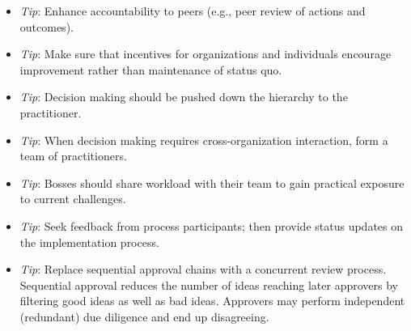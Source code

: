\begin{itemize}
\item \textit{Tip}: Enhance accountability to peers (e.g., peer review of actions and outcomes).
\item \textit{Tip}: Make sure that incentives for organizations and individuals encourage improvement rather than maintenance of status quo.
\item \textit{Tip}: Decision making should be pushed down the hierarchy to the practitioner.
\item \textit{Tip}: When decision making requires cross-organization interaction, form a team of practitioners.
\item \textit{Tip}: Bosses should share workload with their team to gain practical exposure to current challenges.
\item \textit{Tip}: Seek feedback from process participants; then provide status updates on the implementation process.

\item \textit{Tip}: Replace sequential approval chains with a concurrent review process. Sequential approval reduces the number of ideas reaching later approvers by filtering good ideas as well as bad ideas. Approvers may perform independent (redundant) due diligence and end up disagreeing. 
\end{itemize}
